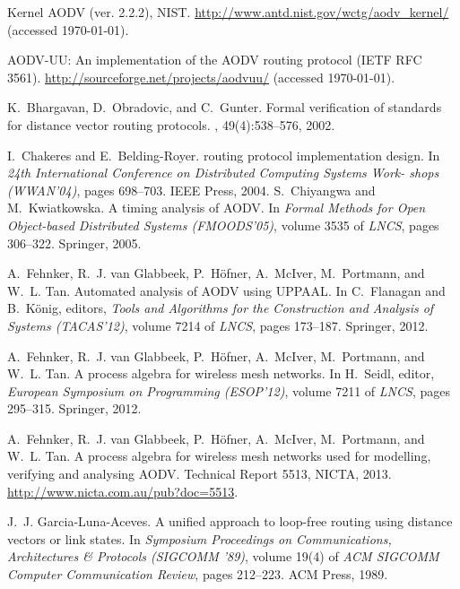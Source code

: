 \documentclass[letterpaper]{sig-alternate-pages}
\begin{document}
\begin{thebibliography}{10}

{Kernel AODV (ver. 2.2.2), NIST}.
\newblock \url{http://www.antd.nist.gov/wctg/aodv_kernel/} (accessed \today).

{AODV-UU}: An implementation of the {AODV} routing protocol {(IETF RFC 3561)}.
\newblock \url{http://sourceforge.net/projects/aodvuu/} (accessed \today).

K.~Bhargavan, D.~Obradovic, and C.~Gunter.
\newblock Formal verification of standards for distance vector routing
  protocols.
, 49(4):538--576, 2002.

I.~Chakeres and E.~Belding-Royer.
 routing protocol implementation design.
\newblock In {\em 24th International Conference on Distributed Computing
  Systems Work- shops (WWAN'04)}, pages 698--703. IEEE Press, 2004.
S.~Chiyangwa and M.~Kwiatkowska.
\newblock A timing analysis of {AODV}.
\newblock In {\em Formal Methods for Open Object-based Distributed Systems
  (FMOODS'05)}, volume 3535 of {\em LNCS}, pages 306--322. Springer, 2005.

A.~Fehnker, R.~J. van Glabbeek, P.~H{\"o}fner, A.~McIver, M.~Portmann, and
  W.~L. Tan.
\newblock Automated analysis of {AODV} using {UPPAAL}.
\newblock In C.~Flanagan and B.~K{\"onig}, editors, {\em Tools and Algorithms
  for the Construction and Analysis of Systems (TACAS'12)}, volume 7214 of {\em
  LNCS}, pages 173--187. Springer, 2012.

A.~Fehnker, R.~J. van Glabbeek, P.~H{\"o}fner, A.~McIver, M.~Portmann, and
  W.~L. Tan.
\newblock A process algebra for wireless mesh networks.
\newblock In H.~Seidl, editor, {\em European Symposium on Programming
  (ESOP'12)}, volume 7211 of {\em LNCS}, pages 295--315. Springer, 2012.

A.~Fehnker, R.~J. van Glabbeek, P.~H{\"o}fner, A.~McIver, M.~Portmann, and
  W.~L. Tan.
\newblock A process algebra for wireless mesh networks used for modelling,
  verifying and analysing {AODV}.
\newblock Technical Report 5513, NICTA, 2013.
\newblock \url{http://www.nicta.com.au/pub?doc=5513}.

J.~J. Garcia-Luna-Aceves.
\newblock A unified approach to loop-free routing using distance vectors or
  link states.
\newblock In {\em Symposium Proceedings on Communications, Architectures \&
  Protocols (SIGCOMM '89)}, volume 19(4) of {\em ACM SIGCOMM Computer
  Communication Review}, pages 212--223. ACM Press, 1989.


\end{thebibliography}
\end{document}
